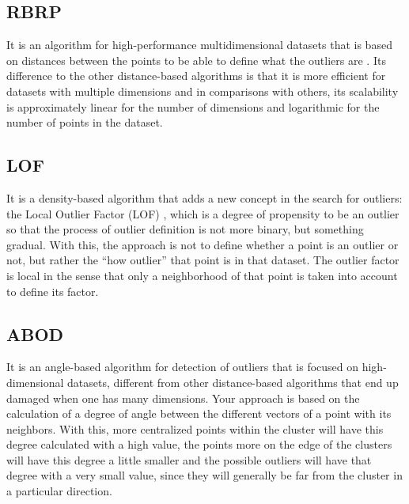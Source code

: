 \subsection{RBRP}

It is an algorithm for high-performance multidimensional datasets that is based on distances between the points to be able to define what the outliers are \cite{Ghoting2006}. Its difference to the other distance-based algorithms is that it is more efficient for datasets with multiple dimensions and in comparisons with others, its scalability is approximately linear for the number of dimensions and logarithmic for the number of points in the dataset.

\subsection{LOF}

It is a density-based algorithm that adds a new concept in the search for outliers: the
Local Outlier Factor (LOF) \cite{Breunig:2000:LID:335191.335388}, which is a degree of propensity to be an outlier so that the
process of outlier definition is not more binary, but something gradual. With this, the
approach is not to define whether a point is an outlier or not, but rather the ``how outlier''
that point is in that dataset. The outlier factor is local in the sense that only a neighborhood
of that point is taken into account to define its factor.





\subsection{ABOD}

It is an angle-based algorithm \cite{Kriegel:2008:AOD:1401890.1401946} for detection of outliers that is focused on high-dimensional datasets, different from other distance-based algorithms that end up damaged when one has many dimensions. Your approach is based on the calculation of a degree of angle between the different vectors of a point with its neighbors. With this, more centralized points within the cluster will have this degree calculated with a high value, the points more on the edge of the clusters will have this degree a little smaller and the possible outliers will have that degree with a very small value, since they will generally be far from the cluster in a particular direction.

